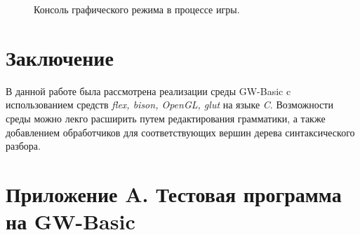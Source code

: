 \documentclass[12pt]{article}
\begin{document}
		\makeatletter
		\setlength{\@fptop}{0pt}
		\makeatother
	
		\begin{figure}[t!]
			\caption{Консоль графического режима в процессе игры.}
			\label{fig:testGame}
		\end{figure}
	\clearpage
	\part*{\centering Заключение}
	\hspace{\parindent}В данной работе была рассмотрена реализации среды GW-Basic c использованием средств {\it flex, bison, OpenGL, glut} на языке {\it C}. Возможности среды можно лекго расширить путем редактирования грамматики, а также добавлением обработчиков для соответствующих вершин дерева синтаксического разбора. 
	\newpage
	\nocite{*}
			
		
	\newpage

	\tableofcontents %
	\newpage 

	\part*{Приложение A. Тестовая программа на GW-Basic}
	
\end{document}
